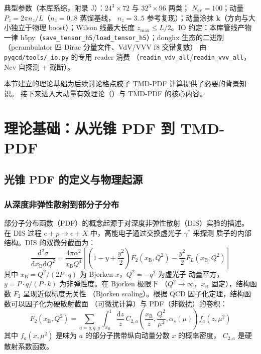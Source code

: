 \documentclass[11pt,a4paper]{ctexart}
\newcommand{\LaMET}{\text{LaMET}}
\newcommand{\code}[1]{\texttt{#1}}
\begin{document}
典型参数（本库系综，附录 J）：$24^3\times72$ 与 $32^3\times96$ 两类；
$N_{\text{ev}}=100$；动量 $P_z=2\pi n_z/L$（$n_z=0..8$ 蒸馏基线，
$n_z=3..5$ 参考复现）；动量涂抹 $\mathbf{k}$（方向与大小独立于物理
boost）；Wilson 线最大长度 $z_{\max}\le L/2$。IO 约定：本库管线产物
一律 h5py（\code{save\_tensor\_h5}/\code{load\_tensor\_h5}）；donghx
生态的二进制（perambulator 四 Dirac 分量文件、VdV/VVV f8 交错复数）
由 \code{pyqcd/tools/\_io.py} 的专用 reader 消费
（\code{readin\_vdv\_all}/\code{readin\_vvv\_all}，Nev 自探测 + 截断）。

本节建立的理论基础为后续讨论格点胶子 TMD-PDF 计算提供了必要的背景知识。
接下来进入大动量有效理论（\LaMET）与 TMD-PDF 的核心内容。

\section{理论基础：从光锥 PDF 到 TMD-PDF}
\label{sec:theory}

\subsection{光锥 PDF 的定义与物理起源}

\subsubsection{从深度非弹性散射到部分子分布}

部分子分布函数（PDF）的概念起源于对深度非弹性散射（DIS）实验的描述。
在 DIS 过程 $e + p \to e + X$ 中，高能电子通过交换虚光子 $\gamma^*$ 来探测
质子的内部结构。DIS 的双微分截面为：
\begin{equation}
\frac{\mathrm{d}^2\sigma}{\mathrm{d}x_{\text{B}} \mathrm{d}Q^2}
= \frac{4\pi\alpha^2}{x_{\text{B}} Q^4} \left[
\left(1 - y + \frac{y^2}{2}\right) F_2(x_{\text{B}}, Q^2)
- \frac{y^2}{2} F_L(x_{\text{B}},Q^2) \right]
\end{equation}
其中 $x_{\text{B}} = Q^2/(2P\cdot q)$ 为 Bjorken-$x$，$Q^2 = -q^2$ 为虚光子
动量平方，$y = P\cdot q/(P\cdot k)$ 为非弹性度。在 Bjorken 极限下
（$Q^2 \to \infty$，$x_{\text{B}}$ 固定），结构函数 $F_2$ 呈现近似标度无关性
（Bjorken scaling）。根据 QCD 因子化定理，结构函数可以因子化为硬散射截面
（可微扰计算）与 PDF（非微扰）的卷积：
\begin{equation}
F_2(x_{\text{B}}, Q^2) = \sum_{a=q,\bar{q},g} \int_{x_{\text{B}}}^{1}
\frac{\mathrm{d}z}{z} \,
C_{2,a}\!\left(\frac{x_{\text{B}}}{z}, \frac{Q^2}{\mu^2}, \alpha_s(\mu)\right)
f_a(z, \mu^2)
\end{equation}
其中 $f_a(x, \mu^2)$ 是味为 $a$ 的部分子携带纵向动量分数 $x$ 的概率密度，
$C_{2,a}$ 是硬散射系数函数。
\end{document}
